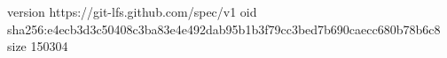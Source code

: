 version https://git-lfs.github.com/spec/v1
oid sha256:e4ecb3d3c50408c3ba83e4e492dab95b1b3f79cc3bed7b690caecc680b78b6c8
size 150304
